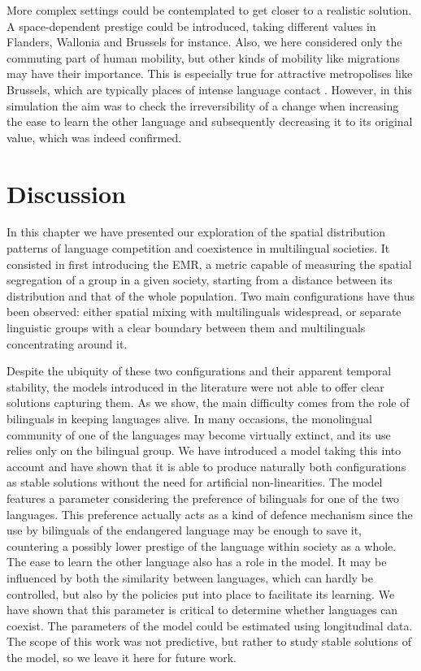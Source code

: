 \documentclass[../thesis.tex]{subfiles}
\begin{document}
More complex settings could be contemplated to get closer to a realistic solution. A
space-dependent prestige could be introduced, taking different values in Flanders,
Wallonia and Brussels for instance. Also, we here considered only the commuting part of
human mobility, but other kinds of mobility like migrations may have their importance.
This is especially true for attractive metropolises like Brussels, which are typically
places of intense language contact \cite{SimonCitiesTranslation2011}. However, in this
simulation the aim was to check the irreversibility of a change when increasing the ease
to learn the other language and subsequently decreasing it to its original value, which
was indeed confirmed. 



\section{Discussion}
\label{sec:multiling_discussion}
In this chapter we have presented our exploration of the spatial distribution patterns of
language competition and coexistence in multilingual societies. It consisted in first
introducing the \ac{EMR}, a metric capable of measuring the spatial
segregation of a group in a given society, starting from a distance between its
distribution and that of the whole population. Two main configurations have thus been
observed: either spatial mixing with multilinguals widespread, or separate linguistic
groups with a clear boundary between them and multilinguals concentrating around it. 

Despite the ubiquity of these two configurations and their apparent temporal stability,
the models introduced in the literature were not able to offer clear solutions capturing
them. As we show, the main difficulty comes from the role of bilinguals in keeping
languages alive. In many occasions, the monolingual community of one of the languages
may become virtually extinct, and its use relies only on the bilingual group. We have
introduced a model taking this into account and have shown that it is able to produce
naturally both configurations as stable solutions without the need for artificial
non-linearities. The model features a parameter considering the preference of bilinguals
for one of the two languages. This preference actually acts as a kind of defence
mechanism since the use by bilinguals of the endangered language may be enough to save
it, countering a possibly lower prestige of the language within society as a whole. The
ease to learn the other language also has a role in the model. It may be influenced by
both the similarity between languages, which can hardly be controlled, but also by the
policies put into place to facilitate its learning. We have shown that this parameter is
critical to determine whether languages can coexist. The parameters of the model could
be estimated using longitudinal data. The scope of this work was not predictive, but
rather to study stable solutions of the model, so we leave it here for future work.
\end{document}
